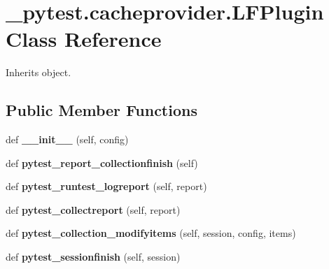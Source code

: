 \hypertarget{class__pytest_1_1cacheprovider_1_1_l_f_plugin}{}\section{\+\_\+pytest.\+cacheprovider.\+L\+F\+Plugin Class Reference}
\label{class__pytest_1_1cacheprovider_1_1_l_f_plugin}


Inherits object.

\subsection*{Public Member Functions}
\begin{DoxyCompactItemize}
\item 
\mbox{\label{class__pytest_1_1cacheprovider_1_1_l_f_plugin_a38aa75acdbc2726d45a2e500aa115248}} 
def {\bfseries \+\_\+\+\_\+init\+\_\+\+\_\+} (self, config)
\item 
\mbox{\label{class__pytest_1_1cacheprovider_1_1_l_f_plugin_afc6cccf59dc4a45eb1e64f1085832e68}} 
def {\bfseries pytest\+\_\+report\+\_\+collectionfinish} (self)
\item 
\mbox{\label{class__pytest_1_1cacheprovider_1_1_l_f_plugin_aa7edb81a7d39b4c3478c982d88fd77ec}} 
def {\bfseries pytest\+\_\+runtest\+\_\+logreport} (self, report)
\item 
\mbox{\label{class__pytest_1_1cacheprovider_1_1_l_f_plugin_a08a9a9419185b78cf1c69be3eed1c8d5}} 
def {\bfseries pytest\+\_\+collectreport} (self, report)
\item 
\mbox{\label{class__pytest_1_1cacheprovider_1_1_l_f_plugin_a971cc46793bbc796c54fce0dc2f313bd}} 
def {\bfseries pytest\+\_\+collection\+\_\+modifyitems} (self, session, config, items)
\item 
\mbox{\label{class__pytest_1_1cacheprovider_1_1_l_f_plugin_a87edc3aad3cc849a29616687d89a6e23}} 
def {\bfseries pytest\+\_\+sessionfinish} (self, session)
\end{DoxyCompactItemize}
